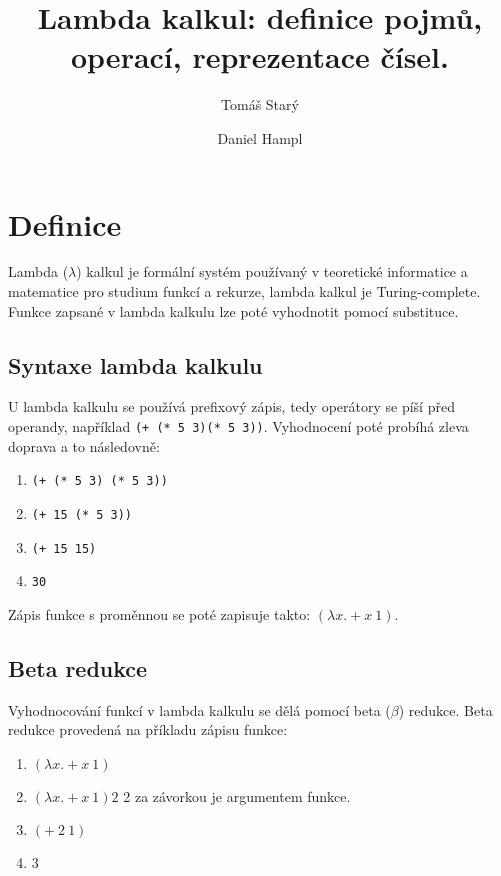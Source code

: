 \documentclass{szzclass}
\title{Lambda kalkul: definice pojmů, operací, reprezentace čísel.}
\author{
    Tomáš Starý
    \and
    Daniel Hampl
}
\begin{document}
\maketitle

\tableofcontents
\newpage

\section{Definice}

Lambda ($\lambda$) kalkul je formální systém používaný v teoretické informatice a matematice pro studium funkcí a rekurze, lambda kalkul je Turing-complete.
Funkce zapsané v lambda kalkulu lze poté vyhodnotit pomocí substituce.

\subsection{Syntaxe lambda kalkulu}

U lambda kalkulu se používá prefixový zápis, tedy operátory se píší před operandy, například \texttt{(+ (* 5 3)(* 5 3))}.
Vyhodnocení poté probíhá zleva doprava a to následovně:
\begin{enumerate}
    \item \texttt{(+ (* 5 3) (* 5 3))}
    \item \texttt{(+ 15 (* 5 3))}
    \item \texttt{(+ 15 15)}
    \item \texttt{30}
\end{enumerate}

Zápis funkce s proměnnou se poté zapisuje takto: $(\lambda x. + x\ 1)$.

\subsection{Beta redukce}

Vyhodnocování funkcí v lambda kalkulu se dělá pomocí beta ($\beta$) redukce.
Beta redukce provedená na příkladu zápisu funkce:
\begin{enumerate}
    \item $(\lambda x. + x\ 1)$
    \item $(\lambda x. + x\ 1)2$
          2 za závorkou je argumentem funkce.
    \item $(+\ 2\ 1)$
    \item 3
\end{enumerate}
\end{document}
